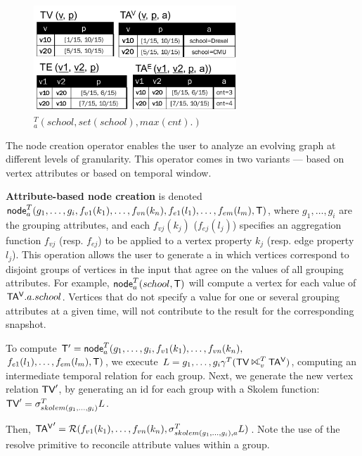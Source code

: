 \begin{figure}[b]
\includegraphics[width=3in]{figs/agg3.pdf}
\vspace{-0.2cm}
\caption{$^T_a(school, set(school), max(cnt).)$}
\vspace{-0.4cm}
\label{fig:tg_agg3}
\end{figure}

The node creation operator enables the user to analyze an evolving
graph at different levels of granularity.  This operator comes in two
variants --- based on vertex attributes or based on temporal window.

{\bf Attribute-based node creation} is denoted\\
$\textsf{node}^T_a(g_1,\ldots,g_i,f_{v1}(k_1),\ldots,f_{vn}(k_n),f_{e1}(l_1),\ldots,f_{em}(l_m),\mathsf{T})$,
where $g_1,\ldots,g_i$ are the grouping attributes, and each
$f_{vj}(k_j)$ ($f_{ej}(l_j)$) specifies an aggregation function
$f_{vj}$ (resp. $f_{ej}$) to be applied to a vertex property $k_j$
(resp. edge property $l_j$).  This operation allows the user to
generate a \tg in which vertices correspond to disjoint groups of
vertices in the input that agree on the values of all grouping
attributes.  For example, $\textsf{node}^T_a(school,\mathsf{T})$ will compute
a vertex for each value of $\mathsf{TA^{V}}.a.school$.  Vertices that do not
specify a value for one or several grouping attributes at a given
time, will not contribute to the result for the corresponding
snapshot.

To compute $\mathsf{T}' =
\textsf{node}^T_a(g_1,\ldots,g_i,f_{v1}(k_1),\ldots,f_{vn}(k_n),$
\\ $f_{e1}(l_1),\ldots,f_{em}(l_m),\mathsf{T})$, we execute $L =
g_1,\ldots,g_i \gamma^T (\tv \rightouterjoin^T_v \tav)$, computing an
intermediate temporal relation for each group.  Next, we generate the
new vertex relation $\textsf{TV}'$, by generating an id for each group with a
Skolem function: $\textsf{TV}' = \sigma^T_{skolem(g_1,\ldots,g_i)}L$.

Then, $\mathsf{TA^{V}}' = \mathcal{R}(f_{v1}(k_1), \ldots,
  f_{vn}(k_n),\sigma^T_{skolem(g_1,\ldots,g_i), a} L)$.  Note the use
of the resolve primitive to reconcile attribute values within a group.

